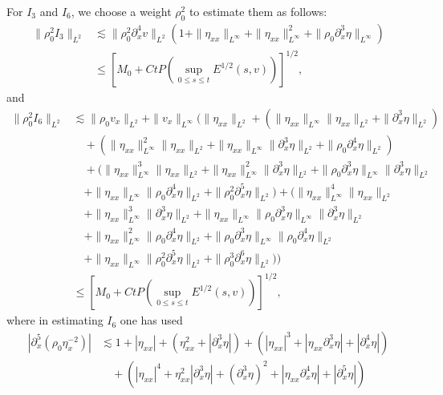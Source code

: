 \documentclass[11pt, reqno]{amsart}
\numberwithin{equation}{section}
\begin{document}
{For \(I_3\) and \(I_6\), we choose a weight \(\rho_0^2\) to estimate them as follows:
\begin{equation*}
\begin{aligned}
\|\rho_0^2I_3\|_{L^2}
&\lesssim \|\rho_0^2\partial_x^4v\|_{L^2}(1+\|\eta_{xx}\|_{L^\infty}
+\|\eta_{xx}\|_{L^\infty}^2
+\|\rho_0\partial_x^3\eta\|_{L^\infty})\\
&\leq [M_0+Ct P(\sup_{0\leq s\leq t}E^{1/2}(s,v))]^{1/2},
\end{aligned}
\end{equation*}
and 
{\small \begin{equation*}
\begin{aligned}
\|\rho_0^2I_6\|_{L^2}
&\lesssim \|\rho_0v_{x}\|_{L^2}+
\|v_{x}\|_{L^\infty}\big(\|\eta_{xx}\|_{L^2}
+(\|\eta_{xx}\|_{L^\infty}\|\eta_{xx}\|_{L^2}
+\|\partial_x^3\eta\|_{L^2})\\
&\quad+(\|\eta_{xx}\|_{L^\infty}^2\|\eta_{xx}\|_{L^2}
+\|\eta_{xx}\|_{L^\infty}\|\partial_x^3\eta\|_{L^2}
+\|\rho_0\partial_x^4\eta\|_{L^2})\\
&\quad+(\|\eta_{xx}\|_{L^\infty}^3\|\eta_{xx}\|_{L^2}
+\|\eta_{xx}\|_{L^\infty}^2\|\partial_x^3\eta\|_{L^2}
+\|\rho_0\partial_x^3\eta\|_{L^\infty}\|\partial_x^3\eta\|_{L^2}\\
&\quad+\|\eta_{xx}\|_{L^\infty}\|\rho_0\partial_x^4\eta\|_{L^2}
+\|\rho_0^2\partial_x^5\eta\|_{L^2})
+(\|\eta_{xx}\|_{L^\infty}^4\|\eta_{xx}\|_{L^2}\\
&\quad+\|\eta_{xx}\|_{L^\infty}^3\|\partial_x^3\eta\|_{L^2}
+\|\eta_{xx}\|_{L^\infty}\|\rho_0\partial_x^3\eta\|_{L^\infty}\|\partial_x^3\eta\|_{L^2}\\
&\quad+\|\eta_{xx}\|_{L^\infty}^2\|\rho_0\partial_x^4\eta\|_{L^2}+\|\rho_0\partial_x^3\eta\|_{L^\infty}\|\rho_0\partial_x^4\eta\|_{L^2}\\
&\quad+\|\eta_{xx}\|_{L^\infty}\|\rho_0^2\partial_x^5\eta\|_{L^2}
+\|\rho_0^3\partial_x^6\eta\|_{L^2})\big)\\
&\leq [M_0+Ct P(\sup_{0\leq s\leq t}E^{1/2}(s,v))]^{1/2},
\end{aligned}
\end{equation*}}
where in estimating \(I_6\) one has used
{\small \begin{equation*}
\begin{aligned}
|\partial_x^5(\rho_0\eta_x^{-2})|
&\lesssim 1+|\eta_{xx}|+(\eta_{xx}^2+|\partial_x^3\eta|)
+(|\eta_{xx}|^3+|\eta_{xx}\partial_x^3\eta|+|\partial_x^4\eta|)\\
&\quad+(|\eta_{xx}|^4+\eta_{xx}^2|\partial_x^3\eta|+(\partial_x^3\eta)^2+|\eta_{xx}\partial_x^4\eta|+|\partial_x^5\eta|)\\

\end{aligned}
\end{equation*}}}
\end{document}
